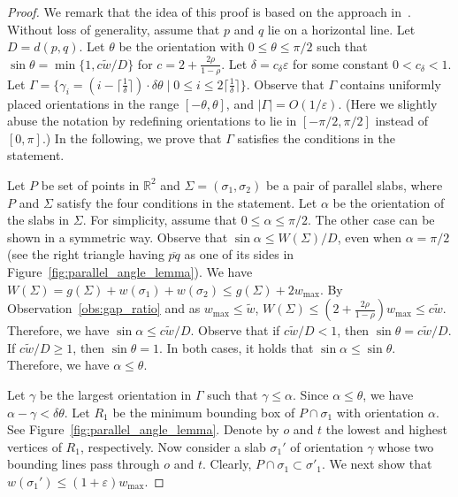 \documentclass[10pt,a4paper]{article}
\theoremstyle{star}
\theoremstyle{claimstar}
\newcommand{\eps}{\ensuremath{\varepsilon}}
\begin{document}
\begin{proof}
    We remark that the idea of this proof is based on the approach in~\cite{agarwalTwo}.
    Without loss of generality, assume that $p$ and $q$ lie on a horizontal line. 
    Let $D = d(p, q)$. 
    Let $\theta$ be the orientation with $0\le \theta \le \pi/2$ such that $\sin\theta = \min \{1, c \widetilde w/{D} \}$ for $c= 2 + \frac{2\rho}{1-\rho}$.
    Let $\delta =  c_\delta \eps$ for some constant $0 < c_\delta < 1$. 
    Let $\Gamma = \{\gamma_i = (i- \lceil \frac{1}{\delta}\rceil)\cdot \delta\theta  \mid 0 \le i \le 2\lceil \frac{1}{\delta}\rceil \}$.
    Observe that $\Gamma$ contains uniformly placed orientations in the range $[-\theta, \theta]$, and $|\Gamma| = O(1/\eps)$. (Here we slightly abuse the notation by redefining orientations to lie in $[-\pi/2, \pi/2]$ instead of $[0, \pi]$.)
    In the following, we prove that $\Gamma$ satisfies the conditions in the statement.

    Let $P$ be set of points in $\mathbb R^2$ and $\Sigma = (\sigma_1, \sigma_2)$ be a pair of parallel slabs, where $P$ and $\Sigma$ satisfy the four conditions in the statement.
    Let $\alpha$ be the orientation of the slabs in $\Sigma$. 
    For simplicity, assume that $0\le \alpha \le \pi/2$. The other case can be shown in a symmetric way. 
    Observe that $\sin \alpha \le W(\Sigma)/D$, even when $\alpha = \pi/2$ (see the right triangle having $\overline{pq}$ as one of its sides in Figure~\ref{fig:parallel_angle_lemma}).
    We have $W(\Sigma) = g(\Sigma) + w(\sigma_1) + w(\sigma_2) \le g(\Sigma) + 2w_{\max} $. 
    By Observation~\ref{obs:gap_ratio} and as $w_{\max} \le \widetilde w$, $W(\Sigma) \le ( 2 + \frac{2\rho}{1-\rho} ) w_{\max}  \le c \widetilde w$.
    Therefore,
    we have $\sin \alpha \le c \widetilde w /D$.
    Observe that if $ c \widetilde w/ D < 1$, then $\sin \theta =  c \widetilde w/ D$. If $ c \widetilde w/ D \ge 1$, then $\sin \theta =1$. In both cases, it holds that $\sin \alpha \le \sin \theta$. Therefore, we have $\alpha \le \theta$. 
    

     Let $\gamma$ be the largest orientation in $\Gamma$ such that $\gamma \le \alpha$. 
     Since $ \alpha \le  \theta$, we have $\alpha - \gamma < \delta \theta$. 
     Let $R_1$ be the minimum bounding box of $P \cap \sigma_1$ with orientation $\alpha$. See Figure~\ref{fig:parallel_angle_lemma}.
     Denote by $o$ and $t$ the lowest and highest vertices of $R_1$, respectively. 
    Now consider a slab $\sigma_1'$ of orientation $\gamma$ whose two bounding lines pass through $o$ and $t$. 
    Clearly, $P\cap \sigma_1 \subset \sigma'_1$. 
    We next show that $w(\sigma_1') \le (1+\eps)w_{\max}$.


\end{proof}
\end{document}
